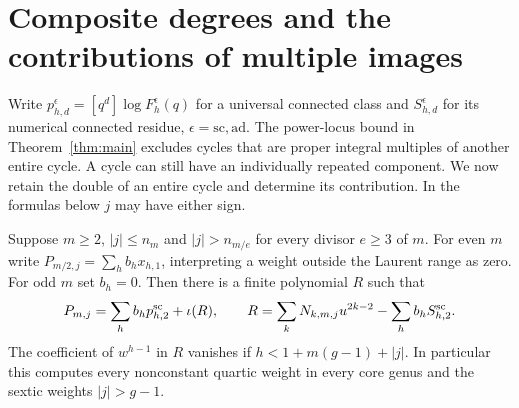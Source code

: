\section{Composite degrees and the contributions of multiple images}
\label{sec:composite}
Write $p_{h,d}^\epsilon=[q^d]\log F_h^\epsilon(q)$ for a universal
connected class and $S_{h,d}^\epsilon$ for its numerical connected
residue, $\epsilon=\mathrm{sc},\mathrm{ad}$. The power-locus bound in
Theorem~\ref{thm:main} excludes cycles that are proper integral multiples of another entire cycle. A cycle can still have an individually repeated component. We now retain the double of an entire cycle and determine its contribution.
In the formulas below $j$ may have either sign.

\begin{theorem}\label{thm:doubleimage}
Suppose $m\ge2$, $|j|\le n_m$ and $|j|>n_{m/e}$ for every divisor
$e\ge3$ of $m$. For even $m$ write
$P_{m/2,j}=\sum_h b_h x_{h,1}$, interpreting a weight outside the
Laurent range as zero. For odd $m$ set $b_h=0$. Then there is a
finite polynomial $R$ such that
\[
 P_{m,j}=\sum_h b_hp_{h,2}^{\rm sc}+\iota(R),\qquad
 R=\sum_kN_{k,m,j}u^{2k-2}-\sum_h b_h S_{h,2}^{\rm sc}.
\]
The coefficient of $w^{h-1}$ in $R$ vanishes if
$h<1+m(g-1)+|j|$. In particular this computes every nonconstant
quartic weight in every core genus and the sextic weights $|j|>g-1$.
\end{theorem}

